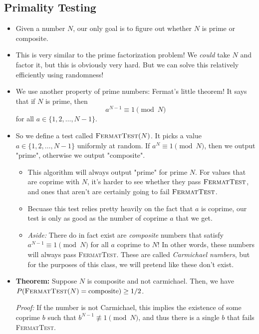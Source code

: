 \subsection{Primality Testing}
\begin{itemize}
	\item Given a number \( N \), our only goal is to figure out whether \( N \) is prime or composite. 
	\item This is very similar to the prime factorization problem! We \textit{could} take \( N \) and factor it, 
		but this is obviously very hard. But we can solve this relatively efficiently using randomness!
	\item We use another property of prime numbers: Fermat's little theorem! It says that if \( N \) is prime, 
		then 
		\[
			a^{N-1} \equiv 1 \pmod{N}
		\] 
		for all \( a \in \{1, 2, \dots, N-1\}  \).
	\item So we define a test called \( \textsc{FermatTest}(N) \). It picks a value \( a \in \{1, 2, \dots, 
		N - 1\}  \) uniformly at random. If \( a^{N} \equiv 1 \pmod N \), then we output "prime", otherwise 
		we output "composite". 
		\begin{itemize}
			\item This algorithm will always output "prime" for prime \( N \). For values that are coprime with 
				\( N \), it's harder to see whether they pass \( \textsc{FermatTest} \), and ones that aren't 
				are certainly going to fail \( \textsc{FermatTest} \).
			\item Becuase this test relies pretty heavily on the fact that \( a \) is coprime, our test is only 
				as good as the number of coprime \( a \) that we get. 
			\item \textit{Aside:} There do in fact exist are \textit{composite} numbers that satisfy
				\( a^{N-1} \equiv 1 \pmod N \) for all \( a \) coprime
		to \( N \)! In other words, these numbers will always pass \textsc{FermatTest}. These are called 
		\textit{Carmichael numbers}, but for the purposes of this class, we will pretend like these don't exist.
		\end{itemize}
	\item \textbf{Theorem:} Suppose \( N \) is composite and not carmichael. Then, we have 
		\( P(\textsc{FermatTest}(N) = \text{composite}) \ge 1 / 2 \). 
		
		\textit{Proof:} If the number is not Carmichael, this implies the existence of some coprime \( b \)
		such that \( b^{N - 1} \not \equiv 1 \pmod N \), and thus there is a single \( b \) that fails
		\textsc{FermatTest}. 
		

\end{itemize}
